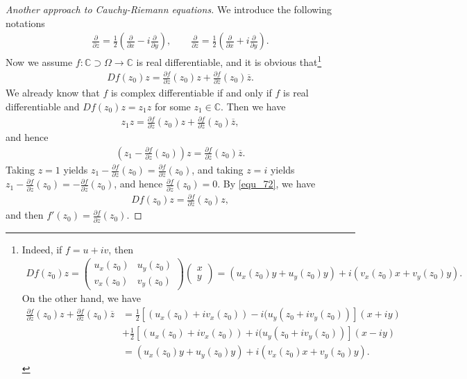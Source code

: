 \documentclass[11pt]{book}
\theoremstyle{definition}
\numberwithin{equation}{chapter}
\begin{document}
\begin{proof}[Another approach to Cauchy-Riemann equations]
We introduce the following notations
\begin{align*}
    \frac{\partial}{\partial z} = \frac{1}{2} \left(\frac{\partial}{\partial x} - i \frac{\partial}{\partial y}\right), \qquad \frac{\partial}{\partial \overline{z}} = \frac{1}{2} \left(\frac{\partial}{\partial x} + i \frac{\partial}{\partial y}\right).
\end{align*}
Now we assume $f: \mathbb{C} \supset \Omega \to \mathbb{C}$ is real differentiable, and it is obvious that\footnote{Indeed, if $f = u + iv$, then 
\begin{align*}
    Df(z_0) z = \begin{pmatrix} u_x(z_0) & u_y(z_0) \\ v_x(z_0) & v_y(z_0) \end{pmatrix} \begin{pmatrix} x \\ y \end{pmatrix} = \left(u_x(z_0)y + u_y(z_0)y\right) + i \left(v_x(z_0)x + v_y(z_0)y\right).
\end{align*}
On the other hand, we have
\begin{align*}
    \frac{\partial f}{\partial z}(z_0) z + \frac{\partial f}{\partial \overline{z}}(z_0) \overline{z} & = \frac{1}{2} \left[(u_x(z_0) + i v_x(z_0)) - i(u_y(z_0 + i v_y(z_0))\right] (x + iy) \\
    & + \frac{1}{2} \left[(u_x(z_0) + i v_x(z_0)) + i(u_y(z_0 + i v_y(z_0))\right] (x - iy) \\
    & = \left(u_x(z_0)y + u_y(z_0)y\right) + i \left(v_x(z_0)x + v_y(z_0)y\right).
\end{align*}
}
\begin{align}\label{equ_72}
    Df(z_0) z = \frac{\partial f}{\partial z}(z_0) z + \frac{\partial f}{\partial \overline{z}}(z_0) \overline{z}.
\end{align}
We already know that $f$ is complex differentiable if and only if $f$ is real differentiable and $Df(z_0)z = z_1 z$ for some $z_1 \in \mathbb{C}$. Then we have
\begin{align*}
    z_1 z = \frac{\partial f}{\partial z}(z_0) z + \frac{\partial f}{\partial \overline{z}}(z_0) \overline{z},
\end{align*}
and hence
\begin{align*}
    \left(z_1 - \frac{\partial f}{\partial z}(z_0)\right) z = \frac{\partial f}{\partial \overline{z}}(z_0) \overline{z}.
\end{align*}
Taking $z = 1$ yields $z_1 - \frac{\partial f}{\partial z}(z_0) = \frac{\partial f}{\partial \overline{z}}(z_0)$, and taking $z = i$ yields $z_1 - \frac{\partial f}{\partial z}(z_0) = - \frac{\partial f}{\partial \overline{z}}(z_0)$, and hence $\frac{\partial f}{\partial \overline{z}}(z_0) = 0$. By \eqref{equ_72}, we have
\begin{align*}
    Df(z_0) z = \frac{\partial f}{\partial z}(z_0) z,
\end{align*}
and then $f'(z_0) = \frac{\partial f}{\partial z}(z_0)$.


\end{proof}
\end{document}
